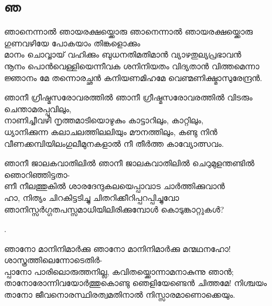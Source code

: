 \subsection{ഞ}
\begin{enumerate}

\begin{slokam}{\VSr}{\KKT}{ഞാനെന്നാൽ ഞായരക്ഷയ്ക്കൊരു}
ഞാനെന്നാൽ ഞായരക്ഷയ്ക്കൊരു ഗുണവഴിയേ പോകയാം തിങ്കളൊക്കും\\
മാനം ചൊവ്വായ്‌ വഹിക്കും ബുധനതിമതിമാൻ വ്യാഴതുല്യപ്രഭാവൻ\\
നൂനം പൊൻവെള്ളിയെന്നീവക ശനിനിയതം വിദ്യതാൻ വിത്തമെന്നാ\\
ജ്ഞാനം മേ തന്നൊരച്ഛൻ കനിയണമിഹമേ വെണ്മണിക്ഷ്മാസുരേന്ദ്രൻ.
\end{slokam}




\begin{slokam}{\VSv}{\VRV}{ഞാനീ ഗ്രീഷ്മസരോവരത്തിൽ}
ഞാനീ ഗ്രീഷ്മസരോവരത്തിൽ വിടരും ചെന്താമരപ്പൂവിലും,\\
നാണിച്ചീവഴി നൃത്തമാടിയൊഴുകും കാട്ടാറിലും, കാറ്റിലും,\\
ധ്യാനിക്കുന്ന കലാചലത്തിലലിയും മൗനത്തിലും, കണ്ടു നിൻ\\
വീണക്കമ്പിയിലംഗുലീമുനകളാൽ നീ തീർത്ത കാവ്യോത്സവം.
\end{slokam}



\begin{slokam}{\VSv}{\VRV}{ഞാനീ ജാലകവാതിലിൽ}
ഞാനീ ജാലകവാതിലിൽ ചെറുമുളന്തണ്ടിൽ ഞൊറിഞ്ഞിട്ടതാ-\\
ണീ നീലത്തുകിൽ ശാരദേന്ദുകലയെപ്പാവാട ചാർത്തിക്കുവാൻ \\
ഹാ, നിത്യം ചിറകിട്ടടിച്ചു ചിതറിക്കീറിപ്പറപ്പിച്ചുവോ\\
ഞാനിസ്സർഗ്ഗതപസ്സമാധിയിലിരിക്കുമ്പോൾ കൊടുങ്കാറ്റുകൾ?
\end{slokam}



.


\begin{slokam}{\VSv}{\KKT}{ഞാനോ മാനിനിമാര്‍ക്കു}
ഞാനോ മാനിനിമാര്‍ക്കു മന്മഥനഹോ! ശാസ്ത്രത്തിലെന്നോടെതിര്‍-\\
പ്പാനോ പാരിലൊരുത്തനില്ല, കവിതയ്ക്കൊന്നാമനാകുന്നു ഞാന്‍;\\
താനോരോന്നിവയോര്‍ത്തുകൊണ്ടു ഞെളിയേണ്ടെന്‍ ചിത്തമേ! നിശ്ചയം\\
താനോ ജീവനൊരസ്ഥിരത്വമതിനാല്‍ നിസ്സാരമാണൊക്കെയും.
\end{slokam}


\end{enumerate}
